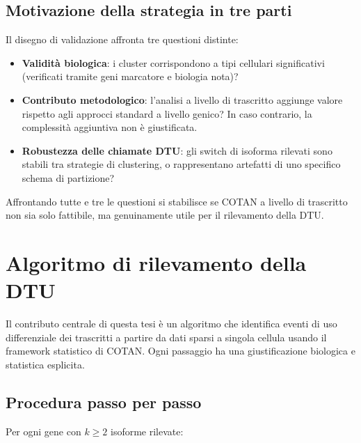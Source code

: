 \subsection*{Motivazione della strategia in tre parti}

Il disegno di validazione affronta tre questioni distinte:

\begin{itemize}
    \item \textbf{Validità biologica}: i cluster corrispondono a tipi cellulari significativi (verificati tramite geni marcatore e biologia nota)?
    \item \textbf{Contributo metodologico}: l'analisi a livello di trascritto aggiunge valore rispetto agli approcci standard a livello genico? In caso contrario, la complessità aggiuntiva non è giustificata.
    \item \textbf{Robustezza delle chiamate DTU}: gli switch di isoforma rilevati sono stabili tra strategie di clustering, o rappresentano artefatti di uno specifico schema di partizione?
\end{itemize}

Affrontando tutte e tre le questioni si stabilisce se COTAN a livello di trascritto non sia solo fattibile, ma genuinamente utile per il rilevamento della DTU.

\section{Algoritmo di rilevamento della DTU}\label{sec:methods-dtu-algorithm}

Il contributo centrale di questa tesi è un algoritmo che identifica eventi di uso differenziale dei trascritti a partire da dati sparsi a singola cellula usando il framework statistico di COTAN. Ogni passaggio ha una giustificazione biologica e statistica esplicita.

\subsection*{Procedura passo per passo}

Per ogni gene con $k \ge 2$ isoforme rilevate:


